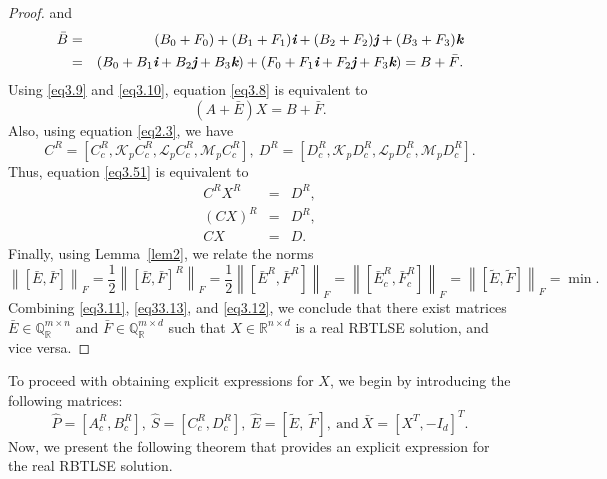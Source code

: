 \documentclass[preprint,11pt,3p]{elsarticle}
\newcommand\norm[1]{\left\lVert#1\right\rVert}
\def \R{{\mathbb R}}
\def \QR{\mathbb{Q}_\mathbb{R}}
\def \i{\textit{\textbf{i}}}
\def \j{\textit{\textbf{j}}}
\def \k{\textit{\textbf{k}}}
\begin{document}
\begin{proof}
	and
	\begin{eqnarray}
		\bar{B}&=& (B_0+ F_0)+ (B_1+ F_1)\i+ (B_2+ F_2)\j+ (B_3+ F_3)\k \nonumber\\
		&=& (B_0+ B_1\i+ B_2\j+ B_3\k)+ (F_0 + F_1\i+ F_2\j+ F_3\k) = B+ \bar{F}. \label{eq3.10}
	\end{eqnarray}
	Using \eqref{eq3.9} and \eqref{eq3.10}, equation \eqref{eq3.8} is equivalent to
	\begin{equation} \label{eq3.11}
		(A+\bar{E})X= B+ \bar{F}.
	\end{equation}
	Also, using equation \eqref{eq2.3}, we have
	\begin{equation*}
		C^R = \left[C^R_c, \mathcal{K}_p C^R_c, \mathcal{L}_p C^R_c, \mathcal{M}_p C^R_c\right], ~ D^R=\left[D^R_c, \mathcal{K}_p D^R_c, \mathcal{L}_p D^R_c, \mathcal{M}_p D^R_c\right].
	\end{equation*}
Thus, equation \eqref{eq3.51} is equivalent to
	\begin{eqnarray}
		C^R X^R&=& D^R, \nonumber\\
		(CX)^R&=& D^R, \nonumber\\
		CX&=& D. \label{eq33.13}
	\end{eqnarray}
	Finally, using Lemma~\ref{lem2}, we relate the norms 
	\begin{equation}\label{eq3.12}
		\norm{[\bar{E}, \bar{F}]}_F= \frac{1}{2} \norm{[\bar{E}, \bar{F}]^R}_F= \frac{1}{2} \norm{[\bar{E}^R, \bar{F}^R]}_F =\norm{[\bar{E}^R_c, \bar{F}^R_c]}_F=  \norm{[\widetilde{E}, \widetilde{F}]}_F= \min.  
	\end{equation}
	Combining \eqref{eq3.11}, \eqref{eq33.13}, and \eqref{eq3.12}, we conclude that there exist matrices $\bar{E} \in \QR^{m \times n}$ and $\bar{F} \in \QR^{m \times d}$ such that
	$X  \in  \R^{n \times d}$ is a real RBTLSE solution, and vice versa.
\end{proof}
To proceed with obtaining explicit expressions for $X$, we begin by introducing the following matrices:
\begin{equation}\label{eq3.122}
 \hat{P}=\left[A^R_c, B^R_c\right], ~ \hat{S}=\left[C^R_c, D^R_c\right], ~ \hat{E} = \left[\widetilde{E}, ~ \widetilde{F}\right], ~ \text{and} ~ \bar{X}=\left[X^T, -I_d\right]^T.
 \end{equation}
 Now, we present the following theorem that provides an explicit expression for the real RBTLSE solution.
\end{document}
